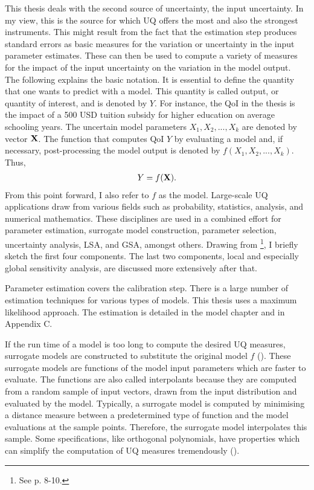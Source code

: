 This thesis deals with the second source of uncertainty, the input uncertainty. In my view, this is the source for which UQ offers the most and also the strongest instruments. This might result from the fact that the estimation step produces standard errors as basic measures for the variation or uncertainty in the input parameter estimates. These can then be used to compute a variety of measures for the impact of the input uncertainty on the variation in the model output.\\
\newline
The following explains the basic notation. It is essential to define the quantity that one wants to predict with a model. This quantity is called output, or quantity of interest, and is denoted by $Y$. For instance, the QoI in the thesis is the impact of a 500 USD tuition subsidy for higher education on average schooling years. The uncertain model parameters $X_1, X_2, ..., X_k$ are denoted by vector $\bold{X}$. The function that computes QoI $Y$ by evaluating a  model and, if necessary, post-processing the model output is denoted by $f(X_1, X_2, ..., X_k)$. Thus,
\begin{align}
Y = f(\bold{X}).
\end{align}
From this point forward, I also refer to $f$ as the model. Large-scale UQ applications draw from various fields such as probability, statistics, analysis, and numerical mathematics. These disciplines are used in a combined effort for parameter estimation, surrogate model construction, parameter selection, uncertainty analysis, LSA, and GSA, amongst others. Drawing from \cite{Smith.2014}\footnote{See p. 8-10.}, I briefly sketch the first four components. The last two components, local and especially global sensitivity analysis, are discussed more extensively after that.

Parameter estimation covers the calibration step. There is a large number of estimation techniques for various types of models. This thesis uses a maximum likelihood approach. The estimation is detailed in the model chapter and in Appendix C.

If the run time of a model is too long to compute the desired UQ measures, surrogate models are constructed to substitute the original model $f$ (\cite{mcbride2019overview}). These surrogate models are functions of the model input parameters which are faster to evaluate. The functions are also called interpolants because they are computed from a random sample of input vectors, drawn from the input distribution and evaluated by the model. Typically, a surrogate model is computed by minimising a distance measure between a predetermined type of function and the model evaluations at the sample points. Therefore, the surrogate model interpolates this sample. Some specifications, like orthogonal polynomials, have properties which can simplify the computation of UQ measures tremendously (\cite{xiu2010numerical}).

